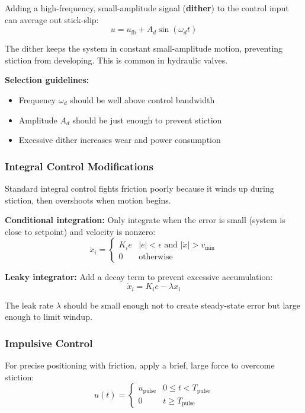 Adding a high-frequency, small-amplitude signal (\textbf{dither}) to the control input can average out stick-slip:
\begin{equation}
u = u_{\text{fb}} + A_d \sin(\omega_d t)
\label{eq:dither}
\end{equation}

The dither keeps the system in constant small-amplitude motion, preventing stiction from developing. This is common in hydraulic valves.

\textbf{Selection guidelines:}
\begin{itemize}
    \item Frequency $\omega_d$ should be well above control bandwidth
    \item Amplitude $A_d$ should be just enough to prevent stiction
    \item Excessive dither increases wear and power consumption
\end{itemize}

\subsubsection{Integral Control Modifications}

Standard integral control fights friction poorly because it winds up during stiction, then overshoots when motion begins.

\textbf{Conditional integration:} Only integrate when the error is small (system is close to setpoint) and velocity is nonzero:
\begin{equation}
\dot{x}_i = \begin{cases}
K_i e & |e| < \epsilon \text{ and } |\dot{x}| > v_{\min} \\
0 & \text{otherwise}
\end{cases}
\end{equation}

\textbf{Leaky integrator:} Add a decay term to prevent excessive accumulation:
\begin{equation}
\dot{x}_i = K_i e - \lambda x_i
\end{equation}

The leak rate $\lambda$ should be small enough not to create steady-state error but large enough to limit windup.

\subsubsection{Impulsive Control}

For precise positioning with friction, apply a brief, large force to overcome stiction:
\begin{equation}
u(t) = \begin{cases}
u_{\text{pulse}} & 0 \leq t < T_{\text{pulse}} \\
0 & t \geq T_{\text{pulse}}
\end{cases}
\end{equation}

